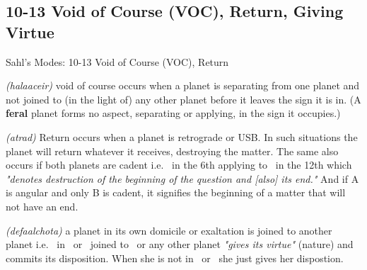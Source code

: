 \subsection{10-13 Void of Course (VOC), Return, Giving Virtue}
\begin{frame}[t]{Sahl's Modes: 10-13 Void of Course (VOC), Return}
\begin{description}[style=nextline]
\item[10. Void of Course] \textsl{(halaaceir)} void of course occurs when a planet is separating from one planet and not joined to (in the light of) any other planet before it leaves the sign it is in. (A \textbf{feral} planet forms no aspect, separating or applying, in the sign it occupies.)

\item[11. Return] \textsl{(atrad)} Return occurs when a planet is retrograde or USB. In such situations the planet will return whatever it receives, destroying the matter. The same also occurs if both planets are cadent i.e. \Moon\ in the 6th applying to \Mars\ in the 12th which \textsl{"denotes destruction of the beginning of the question and [also] its end."} And if A is angular and only B is cadent, it signifies the beginning of a matter that will not have an end.

\item[12-13. Giving Virtue and Nature] \textsl{(defaalchota)} a planet in its own domicile or exaltation is joined to another planet i.e. \Moon\ in \Cancer\ or \Taurus\ joined to \Jupiter\ or any other planet \textsl{"gives its virtue"} (nature) and commits its disposition. When she is not in \Taurus\ or \Cancer\ she just gives her dispostion.\footnotemark[1]
\end{description}
\end{frame}
